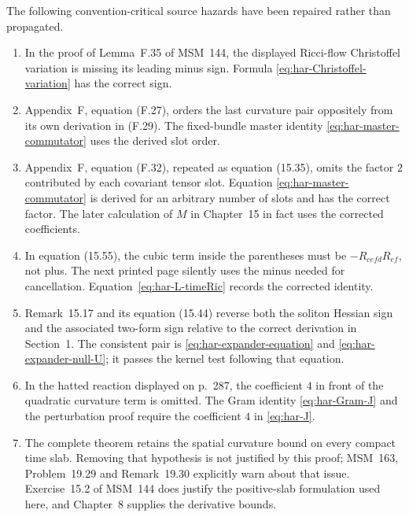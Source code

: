 \documentclass[10pt]{coll-l}
\theoremstyle{definition}
\theoremstyle{remark}
\numberwithin{section}{chapter}
\numberwithin{equation}{chapter}
\begin{document}
The following convention-critical source hazards have been repaired rather
than propagated.
\begin{enumerate}
\item In the proof of Lemma~F.35 of MSM~144, the displayed Ricci-flow
      Christoffel variation is missing its leading minus sign.  Formula
      \eqref{eq:har-Christoffel-variation} has the correct sign.

\item Appendix~F, equation (F.27), orders the last curvature pair
      oppositely from its own derivation in (F.29).  The fixed-bundle master
      identity \eqref{eq:har-master-commutator} uses the derived slot order.

\item Appendix~F, equation (F.32), repeated as equation (15.35), omits the
      factor $2$ contributed by each covariant tensor slot.  Equation
      \eqref{eq:har-master-commutator} is derived for an arbitrary number of
      slots and has the correct factor.  The later calculation of $M$ in
      Chapter~15 in fact uses the corrected coefficients.

\item In equation (15.55), the cubic term inside the parentheses must be
      $-R_{cefd}R_{ef}$, not plus.  The next printed page silently uses the
      minus needed for cancellation.  Equation~\eqref{eq:har-L-timeRic}
      records the corrected identity.

\item Remark~15.17 and its equation (15.44) reverse both the soliton Hessian
      sign and the associated two-form sign relative to the correct
      derivation in Section~1.  The consistent pair is
      \eqref{eq:har-expander-equation} and
      \eqref{eq:har-expander-null-U}; it passes the kernel test following
      that equation.

\item In the hatted reaction displayed on p.~287, the coefficient $4$ in
      front of the quadratic curvature term is omitted.  The Gram identity
      \eqref{eq:har-Gram-J} and the perturbation proof require the
      coefficient $4$ in \eqref{eq:har-J}.

\item The complete theorem retains the spatial curvature bound on every
      compact time slab.  Removing that hypothesis is not justified by this
      proof; MSM~163, Problem~19.29 and Remark~19.30 explicitly warn about
      that issue.  Exercise~15.2 of MSM~144 does justify the positive-slab
      formulation used here, and Chapter~8 supplies the derivative bounds.
\end{enumerate}
\end{document}
